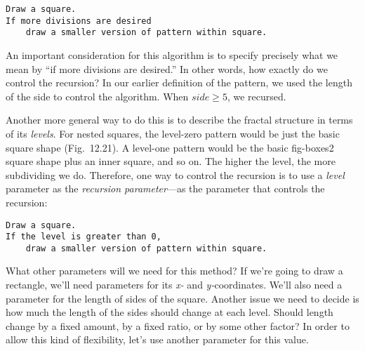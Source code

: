 \begin{jjjlisting}
\begin{lstlisting}
Draw a square.
If more divisions are desired
    draw a smaller version of pattern within square.
\end{lstlisting}
\end{jjjlisting}

An important consideration for this algorithm is to specify precisely
what we mean by ``if more divisions are desired.'' In other words, how
exactly do we control the recursion?  In our earlier definition of the
pattern, we used the length of the side to control the algorithm.  When
$side \geq 5$, we recursed.

Another more general way to do this is to describe the fractal
structure in terms of its {\it levels}. For nested squares, the
level-zero pattern would be just the basic square shape
(Fig.~12.21). A level-one pattern would be the basic
{fig-boxes2}
square shape plus an inner square, and so on.   The higher the level,
the more subdividing we do.   Therefore, one way to control the
recursion is to use a {\it level} parameter as the {\it recursion
parameter}---as the parameter that controls the recursion:

\begin{jjjlisting}
\begin{lstlisting}
Draw a square.
If the level is greater than 0,
    draw a smaller version of pattern within square.
\end{lstlisting}
\end{jjjlisting}

What other parameters will we need for this method? If we're going to
draw a rectangle, we'll need parameters for its {\it x-} and {\it
y-}coordinates.  We'll also need a parameter for the length of sides
of the square.  Another issue we need to decide is how much the length
of the sides should change at each level.  Should length change by a
fixed amount, by a fixed ratio, or by some other factor? In order to
allow this kind of flexibility, let's use another parameter for this
value.

